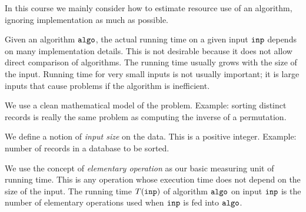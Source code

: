 In this course we mainly consider how to estimate resource use of an algorithm, 
ignoring implementation as much as possible.  

Given an algorithm $\algo$, the actual running time on a given
input $\inp$ depends on many implementation details. This is not desirable
because it does not allow direct comparison of algorithms. 
The running time usually grows with the size of the input.
Running time for very small inputs is not usually important; it is large
inputs that cause problems if the algorithm is inefficient. 

We use a clean mathematical model of the problem. Example: sorting 
distinct records is really the same problem as computing the inverse of a 
permutation. 

We define a notion of  \emph{input size} on the data. This is a positive integer. 
Example: number of records in a database to be sorted.

We use the concept of \emph{elementary operation} as our basic measuring 
unit of running time. This is any operation whose execution time does not depend on the size of the input.
The running time $T(\inp)$ of algorithm $\algo$ on input $\inp$ is the 
number of elementary operations used when $\inp$ is fed into $\algo$.



